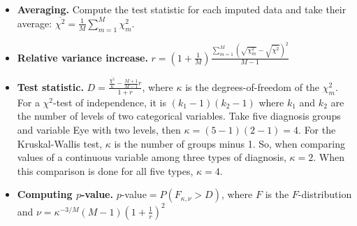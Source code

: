 \documentclass[11pt,a5paper,twoside]{book}
\begin{document}
{\begin{itemize}
	\item \textbf{Averaging.} Compute the test statistic for each imputed data and take their average: $\overline{\chi^2} = \frac{1}{M} \sum_{m=1}^M \chi^2_m$.
	\item \textbf{Relative variance increase.} $r=\left(1+\frac{1}{M} \right) \frac{\sum_{m=1}^M (\sqrt{\chi^2_m} - \sqrt{\overline{\chi^2}})^2}{M-1}$
	\item \textbf{Test statistic.} $D=\frac{\frac{\overline{\chi^2}}{\kappa} - \frac{M+1}{M-1}r}{1+r}$, where $\kappa$ is the degrees-of-freedom of the $\chi^2_m$. For a $\chi^2$-test of independence, it is $(k_1-1)(k_2-1)$ where $k_1$ and $k_2$ are the number of levels of two categorical variables. Take five diagnosis groups and variable \textsf{Eye} with two levels, then $\kappa=(5-1)(2-1)=4$. For the Kruskal-Wallis test, $\kappa$ is the number of groups minus 1. So, when comparing values of a continuous variable among three types of diagnosis, $\kappa=2$. When this comparison is done for all five types, $\kappa=4$. 
	\item \textbf{Computing $p$-value.} $p$-value$=P(F_{\kappa,\nu} > D)$, where $F$ is the $F$-distribution and $\nu=\kappa^{-3/M} (M-1) \left(1+\frac{1}{r}\right)^2$
\end{itemize}

}
\end{document}
